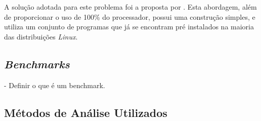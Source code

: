 A solução adotada para este problema foi a proposta por \cite{GeunsikLim2017}. Esta abordagem, além de proporcionar o uso de 100\% do processador, possui uma construção simples, e utiliza um conjunto de programas que já se encontram pré instalados na maioria das distribuições \textit{Linux}.

\subsection{\textit{Benchmarks}}
- Definir o que é um benchmark.



\subsection{Métodos de Análise Utilizados}